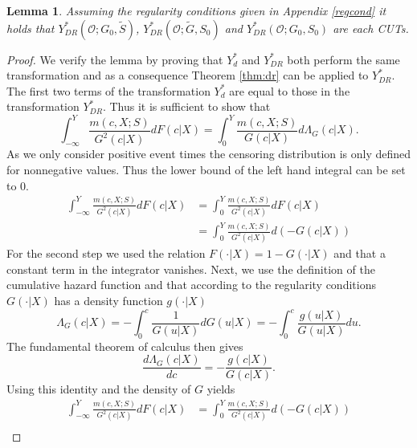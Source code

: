 \documentclass[12pt, a4paper]{scrartcl}
\theoremstyle{definition}
\theoremstyle{plain}
\newtheorem{Lemma}{Lemma}[section]
\numberwithin{equation}{section}
\numberwithin{figure}{section}
\numberwithin{table}{section}
\begin{document}
	\begin{Lemma}
		Assuming the regularity conditions given in Appendix \ref{regcond} it holds that $Y_{DR}^*(\mathcal{O}; G_0, \tilde{S})$, $Y_{DR}^*(\mathcal{O}; \tilde{G}, S_0)$ and $Y_{DR}^*(\mathcal{O}; G_0, S_0)$ are each CUTs.
	\end{Lemma}
	\begin{proof}
		We verify the lemma by proving that $Y_d^*$ and $Y_{DR}^*$ both perform the same transformation and as a consequence Theorem \ref{thm:dr} can be applied to $Y_{DR}^*$.
		The first two terms of the transformation $Y_d^*$ are equal to those in the transformation $Y_{DR}^*$.
		Thus it is sufficient to show that
		\begin{equation*}
		\int_{-\infty}^{Y}\frac{m(c,X;S)}{G^2(c\vert X)}dF(c\vert X) = \int_{0}^{Y} \frac{m(c,X;S)}{G(c \vert X)} d\Lambda_G(c \vert X).
		\end{equation*}
		As we only consider positive event times the censoring distribution is only defined for nonnegative values.
		Thus the lower bound of the left hand integral can be set to 0.
		\begin{equation*}
		\begin{split}
		\int_{-\infty}^{Y}\frac{m(c,X;S)}{G^2(c\vert X)}dF(c\vert X) &={} \int_{0}^{Y}\frac{m(c,X;S)}{G^2(c\vert X)}dF(c\vert X)\\
		&={} \int_{0}^{Y}\frac{m(c,X;S)}{G^2(c\vert X)}d(-G(c\vert X))
		\end{split}
		\end{equation*}
		For the second step we used the relation $F(\cdot\vert X)= 1-G(\cdot\vert X)$ and that a constant term in the integrator vanishes.
		Next, we use the definition of the cumulative hazard function and that according to the regularity conditions $G(\cdot \vert X)$ has a density function $g(\cdot \vert X)$
		\begin{equation*}
			\Lambda_G(c \vert X) = - \int_{0}^{c}\frac{1}{G(u\vert X)}dG(u\vert X) = - \int_{0}^{c}\frac{g(u\vert X)}{G(u\vert X)}du.
		\end{equation*}
		The fundamental theorem of calculus then gives
		\begin{equation*}
		\frac{d\Lambda_G(c \vert X)}{dc} = -\frac{g(c\vert X)}{G(c\vert X)}.
		\end{equation*}
		Using this identity and the density of $G$ yields
		\begin{equation*}
		\begin{split}
		\int_{-\infty}^{Y}\frac{m(c,X;S)}{G^2(c\vert X)}dF(c\vert X) &={} \int_{0}^{Y}\frac{m(c,X;S)}{G^2(c\vert X)}d(-G(c\vert X))\\

\end{split}
\end{equation*}
\end{proof}
\end{document}
